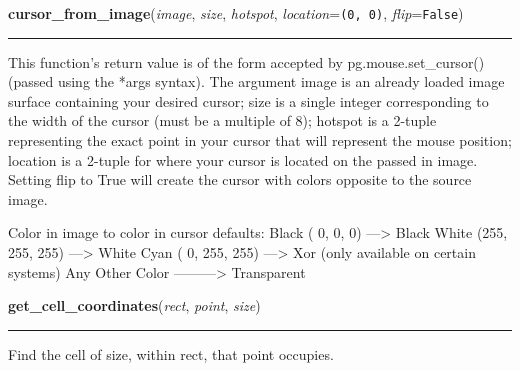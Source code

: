 \hspace{.8\funcindent}\begin{boxedminipage}{\funcwidth}

    \raggedright \textbf{cursor\_from\_image}(\textit{image}, \textit{size}, \textit{hotspot}, \textit{location}={\tt \texttt{(}0\texttt{, }0\texttt{)}}, \textit{flip}={\tt False})

    \vspace{-1.5ex}

    \rule{\textwidth}{0.5\fboxrule}
\setlength{\parskip}{2ex}
    This function's return value is of the form accepted by 
    pg.mouse.set\_cursor() (passed using the *args syntax). The argument 
    image is an already loaded image surface containing your desired 
    cursor; size is a single integer corresponding to the width of the 
    cursor (must be a multiple of 8); hotspot is a 2-tuple representing the
    exact point in your cursor that will represent the mouse position; 
    location is a 2-tuple for where your cursor is located on the passed in
    image. Setting flip to True will create the cursor with colors opposite
    to the source image.

    Color in image to color in cursor defaults: Black (  0,   0,   0) 
    ---{\textgreater} Black White (255, 255, 255) ---{\textgreater} White 
    Cyan  (  0, 255, 255) ---{\textgreater} Xor (only available on certain 
    systems) Any Other Color ---------{\textgreater} Transparent

\setlength{\parskip}{1ex}
    \end{boxedminipage}

    \label{pygame-asteroids:tools:get_cell_coordinates}

    \vspace{0.5ex}

\hspace{.8\funcindent}\begin{boxedminipage}{\funcwidth}

    \raggedright \textbf{get\_cell\_coordinates}(\textit{rect}, \textit{point}, \textit{size})

    \vspace{-1.5ex}

    \rule{\textwidth}{0.5\fboxrule}
\setlength{\parskip}{2ex}
    Find the cell of size, within rect, that point occupies.

\setlength{\parskip}{1ex}
    \end{boxedminipage}

